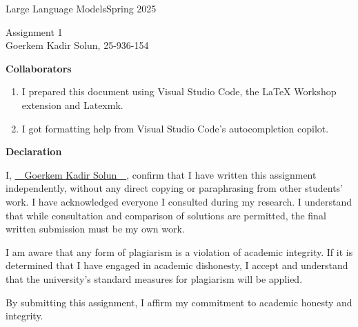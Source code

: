 \documentclass[a4paper,12pt]{ETHexercise}
\begin{document}
{\Large Large Language Models}{Spring 2025}

\vspace{5mm}
\begin{center}
    {\Huge Assignment 1 \\ \vspace{5mm} \Large Goerkem Kadir Solun, 25-936-154}\\
\end{center}

\vspace{3cm}

\begin{center}
    {\large \textbf{Collaborators}}
    \begin{enumerate}
        \item I prepared this document using Visual Studio Code, the LaTeX Workshop extension and Latexmk.
        \item I got formatting help from Visual Studio Code's autocompletion copilot.
    \end{enumerate}
\end{center}

\begin{center}
    {\large \textbf{Declaration}}
\end{center}

I, \textcolor{ETHGreen}{{\cursive\setul{0.1ex}{}\ul{~~Goerkem Kadir Solun~~}}}, confirm that I have written this assignment independently, without any direct copying or paraphrasing from other students' work. 
I have acknowledged everyone I consulted during my research. 
I understand that while consultation and comparison of solutions are permitted, the final written submission must be my own work.

I am aware that any form of plagiarism is a violation of academic integrity. If it is determined that I have engaged in academic dishonesty, I accept and understand that the university's standard measures for plagiarism will be applied.

By submitting this assignment, I affirm my commitment to academic honesty and integrity.

\newpage


\newpage


\newpage


\newpage


\newpage
\end{document}
